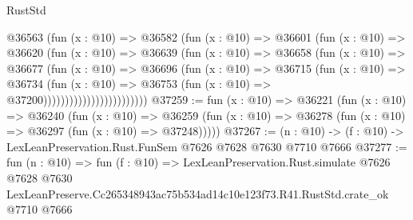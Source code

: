 \begin{lexlean}{RustStd}
\begin{coremodule}
                            @36563
                              (fun (x : @10) =>
                              @36582
                                (fun (x : @10) =>
                                @36601
                                  (fun (x : @10) =>
                                  @36620
                                    (fun (x : @10) =>
                                    @36639
                                      (fun (x : @10) =>
                                      @36658
                                        (fun (x : @10) =>
                                        @36677
                                          (fun (x : @10) =>
                                          @36696
                                            (fun (x : @10) =>
                                            @36715
                                              (fun (x : @10) =>
                                              @36734
                                                (fun (x : @10) =>
                                                @36753
                                                  (fun (x : @10) => @37200))))))))))))))))))))))))
@37259 := fun (x : @10) =>
  @36221
    (fun (x : @10) =>
    @36240
      (fun (x : @10) =>
      @36259 (fun (x : @10) => @36278 (fun (x : @10) => @36297 (fun (x : @10) => @37248)))))
@37267 := (n : @10) -> (f : @10) -> LexLeanPreservation.Rust.FunSem @7626 @7628 @7630 @7710 @7666
@37277 := fun (n : @10) =>
  fun (f : @10) =>
  LexLeanPreservation.Rust.simulate
    @7626
    @7628
    @7630
    LexLeanPreserve.Cc265348943ac75b534ad14c10e123f73.R41.RustStd.crate_ok
    @7710
    @7666
\end{coremodule}
\end{lexlean}
